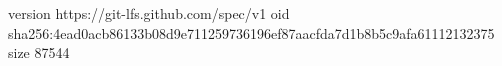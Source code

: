 version https://git-lfs.github.com/spec/v1
oid sha256:4ead0acb86133b08d9e711259736196ef87aacfda7d1b8b5c9afa61112132375
size 87544
